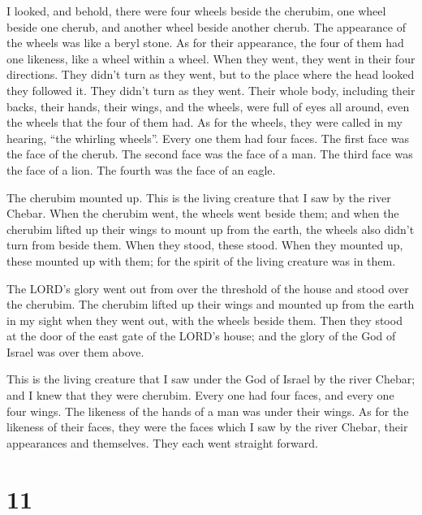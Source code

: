  I looked, and behold, there were four wheels beside the
cherubim, one wheel beside one cherub, and another wheel beside another
cherub. The appearance of the wheels was like a beryl stone.
 As for their appearance, the four of them had one
likeness, like a wheel within a wheel.  When they went,
they went in their four directions. They didn't turn as they went, but
to the place where the head looked they followed it. They didn't turn as
they went.  Their whole body, including their backs,
their hands, their wings, and the wheels, were full of eyes all around,
even the wheels that the four of them had.  As for the
wheels, they were called in my hearing, ``the whirling wheels''.
 Every one them had four faces. The first face was the
face of the cherub. The second face was the face of a man. The third
face was the face of a lion. The fourth was the face of an eagle.

 The cherubim mounted up. This is the living creature
that I saw by the river Chebar.  When the cherubim went,
the wheels went beside them; and when the cherubim lifted up their wings
to mount up from the earth, the wheels also didn't turn from beside
them.  When they stood, these stood. When they mounted
up, these mounted up with them; for the spirit of the living creature
was in them.

 The LORD's glory went out from over the threshold of the
house and stood over the cherubim.  The cherubim lifted
up their wings and mounted up from the earth in my sight when they went
out, with the wheels beside them. Then they stood at the door of the
east gate of the LORD's house; and the glory of the God of Israel was
over them above.

 This is the living creature that I saw under the God of
Israel by the river Chebar; and I knew that they were cherubim.
 Every one had four faces, and every one four wings. The
likeness of the hands of a man was under their wings.  As
for the likeness of their faces, they were the faces which I saw by the
river Chebar, their appearances and themselves. They each went straight
forward.

\hypertarget{section-9}{%
\section{11}\label{section-9}}

